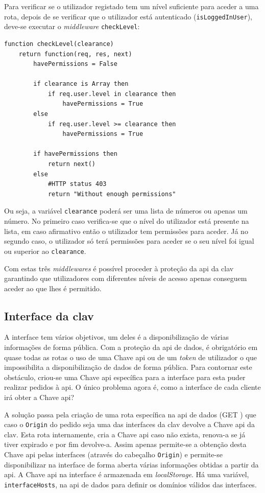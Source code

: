 Para verificar se o utilizador registado tem um nível suficiente para aceder a uma rota, depois de se verificar que o utilizador está autenticado (\texttt{isLoggedInUser}), deve-se executar o \textit{middleware} \texttt{checkLevel}:
\begin{lstlisting}[language=pseudocode, caption=Verificação se um utilizador registado tem permissões suficientes para aceder a uma determinada rota]
function checkLevel(clearance)
    return function(req, res, next)
        havePermissions = False

        if clearance is Array then
            if req.user.level in clearance then
                havePermissions = True
        else
            if req.user.level >= clearance then
                havePermissions = True

        if havePermissions then
            return next()
        else
            #HTTP status 403
            return "Without enough permissions"
\end{lstlisting}
Ou seja, a variável \texttt{clearance} poderá ser uma lista de números ou apenas um número. No primeiro caso verifica-se que o nível do utilizador está presente na lista, em caso afirmativo então o utilizador tem permissões para aceder. Já no segundo caso, o utilizador só terá permissões para aceder se o seu nível foi igual ou superior ao \texttt{clearance}.

Com estas três \textit{middlewares} é possível proceder à proteção da \acrshort{api} da \acrshort{clav} garantindo que utilizadores com diferentes níveis de acesso apenas conseguem aceder ao que lhes é permitido.

\subsection{Interface da \acrshort{clav}}

A interface tem vários objetivos, um deles é a disponibilização de várias informações de forma pública. Com a proteção da \acrshort{api} de dados, é obrigatório em quase todas as rotas o uso de uma Chave \acrshort{api} ou de um \textit{token} de utilizador o que impossibilita a disponibilização de dados de forma pública. Para contornar este obstáculo, criou-se uma Chave \acrshort{api} específica para a interface para esta puder realizar pedidos à \acrshort{api}. O único problema agora é, como a interface de cada cliente irá obter a Chave \acrshort{api}?

A solução passa pela criação de uma rota específica na \acrshort{api} de dados (GET ) que caso o \texttt{Origin} do pedido seja uma das interfaces da \acrshort{clav} devolve a Chave \acrshort{api} da \acrshort{clav}. Esta rota internamente, cria a Chave \acrshort{api} caso não exista, renova-a se já tiver expirado e por fim devolve-a. Assim apenas permite-se a obtenção desta Chave \acrshort{api} pelas interfaces (através do cabeçalho \texttt{Origin}) e permite-se disponibilizar na interface de forma aberta várias informações obtidas a partir da \acrshort{api}. A Chave \acrshort{api} na interface é armazenada em \textit{localStorage}. Há uma variável, \texttt{interfaceHosts}, na \acrshort{api} de dados para definir os domínios válidos das interfaces.

